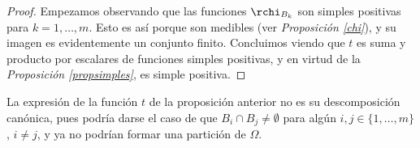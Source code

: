 \begin{proof}
	Empezamos observando que las funciones $\rchi_{B_k}$ son simples positivas para $k=1,\dots,m$. Esto es así porque son medibles (ver \textit{Proposición \ref{chi}}), y su imagen es evidentemente un conjunto finito. Concluimos viendo que $t$ es suma y producto por escalares de funciones simples positivas, y en virtud de la \textit{Proposición \ref{propsimples}}, es simple positiva.
\end{proof}

\begin{nota}
	La expresión de la función $t$ de la proposición anterior no es su descomposición canónica, pues podría darse el caso de que $B_i \cap B_j \neq \emptyset$ para algún $i,j \in \{1,\dots,m\}$, $i\neq j$, y ya no podrían formar una partición de $\Omega$.
\end{nota}

